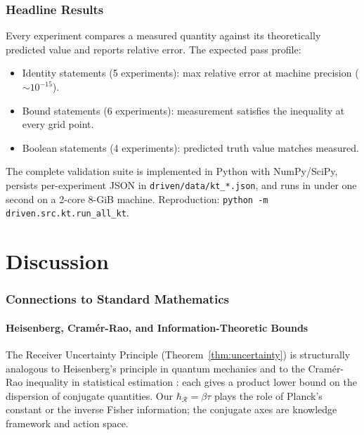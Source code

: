 \documentclass[11pt,a4paper]{article}
\newcommand{\receiver}{\mathcal{R}}
\newcommand{\hbarR}{\hbar_{\receiver}}
\begin{document}
\section{Headline Results}
\label{sec:headline-results}

Every experiment compares a measured quantity against its theoretically predicted value and reports relative error. The expected pass profile:
\begin{itemize}[nosep]
\item Identity statements (5 experiments): max relative error at machine precision ($\sim 10^{-15}$).
\item Bound statements (6 experiments): measurement satisfies the inequality at every grid point.
\item Boolean statements (4 experiments): predicted truth value matches measured.
\end{itemize}

The complete validation suite is implemented in Python with NumPy/SciPy, persists per-experiment JSON in \texttt{driven/data/kt\_*.json}, and runs in under one second on a 2-core 8-GiB machine. Reproduction: \texttt{python -m driven.src.kt.run\_all\_kt}.

\part{Discussion}

\section{Connections to Standard Mathematics}
\label{sec:connections}

\subsection{Heisenberg, Cramér-Rao, and Information-Theoretic Bounds}

The Receiver Uncertainty Principle (Theorem~\ref{thm:uncertainty}) is structurally analogous to Heisenberg's principle in quantum mechanics \citep{heisenberg1927,kennard1927,robertson1929} and to the Cramér-Rao inequality in statistical estimation \citep{rao1945information,cramer1946mathematical}: each gives a product lower bound on the dispersion of conjugate quantities. Our $\hbarR = \beta \tau$ plays the role of Planck's constant or the inverse Fisher information; the conjugate axes are knowledge framework and action space.
\end{document}
